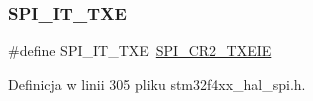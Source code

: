 \subsubsection{\texorpdfstring{S\+P\+I\+\_\+\+I\+T\+\_\+\+T\+XE}{SPI\_IT\_TXE}}
{\footnotesize\ttfamily \#define S\+P\+I\+\_\+\+I\+T\+\_\+\+T\+XE~\hyperlink{group___peripheral___registers___bits___definition_ga23f683a1252ccaf625cae1a978989b2c}{S\+P\+I\+\_\+\+C\+R2\+\_\+\+T\+X\+E\+IE}}



Definicja w linii 305 pliku stm32f4xx\+\_\+hal\+\_\+spi.\+h.

